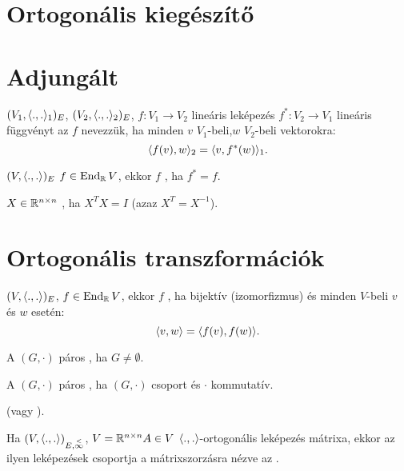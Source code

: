 \section{Ortogonális kiegészítő}

\section{Adjungált}
\begin{ff}
	$(V_1,\langle.,.\rangle_1)_E$, $(V_2,\langle.,.\rangle_2)_E$, $f:V_1\to V_2$ lineáris leképezés
	$f^*:V_2\to V_1$ lineáris függvényt az $f$  nevezzük, ha
	minden $v$ $V_1$-beli,$w$ $V_2$-beli vektorokra:
	\begin{equation*}
		\langle f(v),w\rangle_2=\langle v,f^*(w)\rangle_1.
	\end{equation*}
\end{ff}
\begin{ff}
	$(V,\langle.,.\rangle)_E$ $f\in\operatorname{End}_{\mathbb{R}} V$, ekkor $f$ , ha $f^*=f$.
\end{ff}
\begin{ff}
	$X\in\mathbb{R}^{n\times n}$ , ha $X^TX=I$ (azaz $X^T=X^{-1}$).
\end{ff}

\section{Ortogonális transzformációk}
\begin{ff}
	$(V,\langle.,.\rangle)_E$, $f\in\operatorname{End}_{\mathbb{R}} V$, ekkor $f$ , ha
	bijektív (izomorfizmus) és minden $V$-beli $v$ és $w$ esetén:
	\begin{equation*}
		\langle v,w\rangle=\langle f(v),f(w)\rangle.
	\end{equation*}
\end{ff}


\begin{ff}
	A $(G,\cdot)$ páros , ha $G\neq\emptyset$.
\end{ff}
\begin{ff}
	A $(G,\cdot)$ páros , ha $(G,\cdot)$ csoport és $\cdot$ 
	kommutatív.
\end{ff}


\begin{jel}
	 (vagy \vjel{$\vO_{\scp{}}$}).
\end{jel}

\begin{ff}
	Ha $(V,\langle.,.\rangle)_{E,\overset{<}{\infty}}$, $V=\mathbb{R}^{n\times n} A\in V$ $\langle.,.\rangle$-ortogonális leképezés mátrixa, ekkor az
	ilyen leképezések csoportja a mátrixszorzásra nézve az .
\end{ff}

